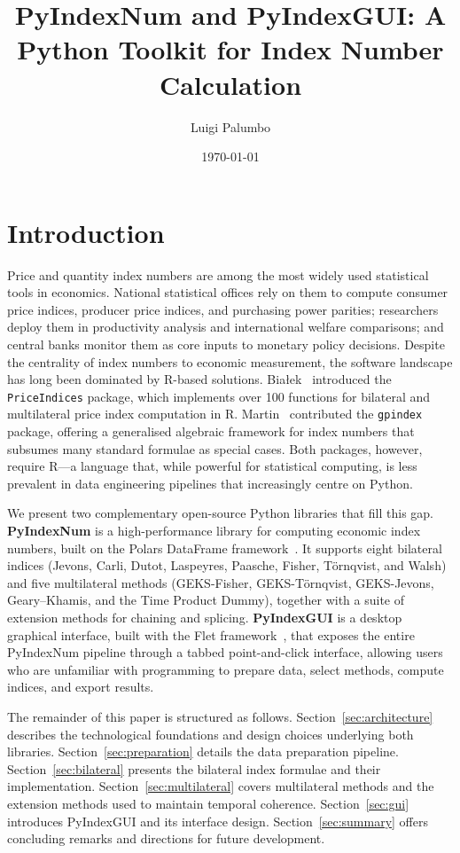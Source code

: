 \documentclass[12pt,a4paper]{article}
\title{PyIndexNum and PyIndexGUI: A Python Toolkit for Index Number Calculation}
\author{Luigi Palumbo}
\date{\today}
\begin{document}
\maketitle

\section{Introduction}

Price and quantity index numbers are among the most widely used statistical tools in economics. National statistical offices rely on them to compute consumer price indices, producer price indices, and purchasing power parities; researchers deploy them in productivity analysis and international welfare comparisons; and central banks monitor them as core inputs to monetary policy decisions. Despite the centrality of index numbers to economic measurement, the software landscape has long been dominated by R-based solutions. Białek~\autocite{bialek2021statistika} introduced the \texttt{PriceIndices} package, which implements over 100 functions for bilateral and multilateral price index computation in R. Martin~\autocite{martin2020gpindex} contributed the \texttt{gpindex} package, offering a generalised algebraic framework for index numbers that subsumes many standard formulae as special cases. Both packages, however, require R---a language that, while powerful for statistical computing, is less prevalent in data engineering pipelines that increasingly centre on Python.

We present two complementary open-source Python libraries that fill this gap. \textbf{PyIndexNum} is a high-performance library for computing economic index numbers, built on the Polars DataFrame framework~\autocite{nahrstedt2024polars}. It supports eight bilateral indices (Jevons, Carli, Dutot, Laspeyres, Paasche, Fisher, Törnqvist, and Walsh) and five multilateral methods (GEKS-Fisher, GEKS-Törnqvist, GEKS-Jevons, Geary--Khamis, and the Time Product Dummy), together with a suite of extension methods for chaining and splicing. \textbf{PyIndexGUI} is a desktop graphical interface, built with the Flet framework~\autocite{flet2024framework}, that exposes the entire PyIndexNum pipeline through a tabbed point-and-click interface, allowing users who are unfamiliar with programming to prepare data, select methods, compute indices, and export results.

The remainder of this paper is structured as follows. Section~\ref{sec:architecture} describes the technological foundations and design choices underlying both libraries. Section~\ref{sec:preparation} details the data preparation pipeline. Section~\ref{sec:bilateral} presents the bilateral index formulae and their implementation. Section~\ref{sec:multilateral} covers multilateral methods and the extension methods used to maintain temporal coherence. Section~\ref{sec:gui} introduces PyIndexGUI and its interface design. Section~\ref{sec:summary} offers concluding remarks and directions for future development.
\end{document}

